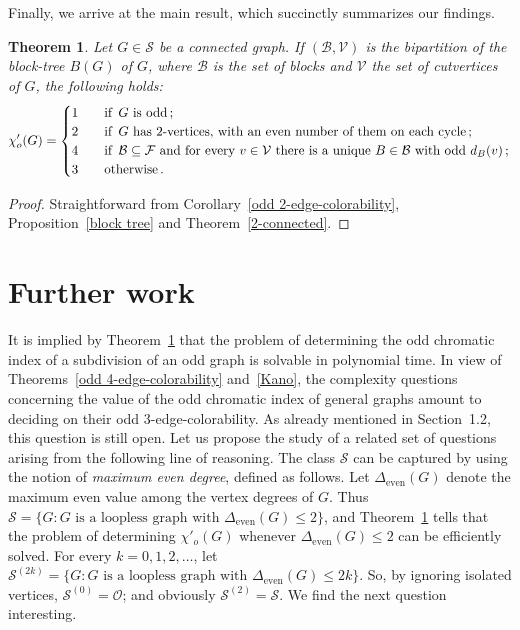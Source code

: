 \documentclass[a4paper,12pt]{article}
\newtheorem{theorem}{Theorem}[section]
\numberwithin{equation}{section}
\begin{document}

\bigskip

  Finally, we arrive at the main result, which succinctly summarizes our findings.



\begin{theorem}
    \label{thm}
Let $G\in \mathcal{S}$ be a connected graph. If $(\mathcal{B},\mathcal{V})$ is the bipartition of the block-tree $B(G)$ of $G$, where $\mathcal{B}$ is the set of blocks and $\mathcal{V}$ the set of cutvertices of $G$, the following holds:
\begin{equation*}
\chi'_o(G)=
\begin{cases}
1 & \text{\quad if \,} G \text{ is odd} \,;\\
2 & \text{\quad if \,} G \text{ has 2-vertices, with an even number of them on each cycle}\,;\\
4 & \text{\quad if \,} \mathcal{B}\subseteq\mathcal{F} \text{ and for every }  v\in\mathcal{V} \text{ there is a unique } B\in\mathcal{B} \text{ with odd } d_B(v)\,;\\
3 & \text{\quad otherwise}\,.
\end{cases}
\end{equation*}
\end{theorem}
\begin{proof}
Straightforward from Corollary~\ref{odd 2-edge-colorability}, Proposition~\ref{block tree} and Theorem~\ref{2-connected}.
\end{proof}

\section{Further work}

It is implied by Theorem~\ref{thm} that the problem of determining the odd chromatic index of a subdivision of an odd graph is solvable in polynomial time. In view of Theorems~\ref{odd 4-edge-colorability} and~\ref{Kano}, the complexity questions concerning the value of the odd chromatic index of general graphs amount to deciding on their odd $3$-edge-colorability. As already mentioned in Section~1.2, this question is still open.
Let us propose the study of a related set of questions arising from the following line of reasoning. The class $\mathcal{S}$ can be captured by using the notion of \textit{maximum even degree}, defined as follows. Let $\Delta_{\mathrm{even}}(G)$ denote the maximum even value among the vertex degrees of $G$. Thus $\mathcal{S}=\{G: G \text{ is a loopless graph with }\Delta_{\mathrm{even}}(G)\leq2\}$, and Theorem~\ref{thm} tells that the problem of determining $\chi'_o(G)$ whenever $\Delta_{\mathrm{even}}(G)\leq2$ can be efficiently solved. For every $k=0,1,2,\ldots$, let  $\mathcal{S}^{(2k)}=\{G: G \text{ is a loopless graph with }\Delta_{\mathrm{even}}(G)\leq2k\}$. So, by ignoring isolated vertices, $\mathcal{S}^{(0)}=\mathcal{O}$; and obviously  $\mathcal{S}^{(2)}=\mathcal{S}$. We find the next question interesting.
\end{document}
